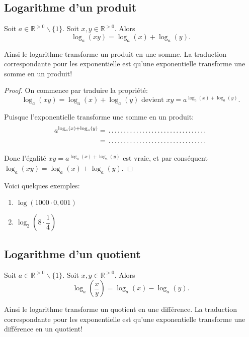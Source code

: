 \documentclass[a4paper,12pt,singlepage]{report}
\newcommand{\IR}{\mathbb{R}}
\newcommand{\jdot}[1]{ \makebox[#1]{\dotfill}}
\begin{document}
\subsection{Logarithme d'un produit}
\label{sec:orga3bcfb6}

\begin{propriete}
Soit \(a\in\IR^{>0}\backslash\{1\}\). Soit \(x,y\in\IR^{>0}\). Alors
\[
\log_a(xy)=\log_a(x)+\log_a(y).
\]
\end{propriete}
Ainsi le logarithme transforme un produit en une somme. La traduction
correspondante pour les exponentielle est qu'une exponentielle transforme une
somme en un produit!

\begin{proof}
On commence par traduire la propriété:
\[
\log_a(xy)=\log_a(x)+\log_a(y)\text{ devient }
xy=a^{\log_a(x)+\log_a(y)}.
\]

Puisque l'exponentielle transforme une somme en un produit:
\begin{align*}
a^{\log_a(x)+\log_a(y)} &=\jdot{5cm}\\
&=\jdot{5cm}
\end{align*}

Donc l'égalité \(xy=a^{\log_a(x)+\log_a(y)}\) est vraie, et par
conséquent  \(\log_a(xy)=\log_a(x)+\log_a(y)\).
\end{proof}

\begin{exemple}
Voici quelques exemples:

\begin{enumerate}
\item \(\log(1000\cdot 0,001)\)
\vspace{2cm}
\item \(\log_2\left(8\cdot\dfrac{1}{4}\right)\)
\vspace{2cm}
\end{enumerate}
\end{exemple}
\subsection{Logarithme d'un quotient}
\label{sec:org8024308}
\begin{propriete}
Soit \(a\in\IR^{>0}\backslash\{1\}\). Soit \(x,y\in\IR^{>0}\). Alors
\[
\log_a\left(\dfrac{x}{y}\right)=\log_a(x)-\log_a(y).
\]
\end{propriete}
Ainsi le logarithme transforme un quotient en une différence. La traduction
correspondante pour les exponentielle est qu'une exponentielle transforme une
différence en un quotient!
\end{document}
